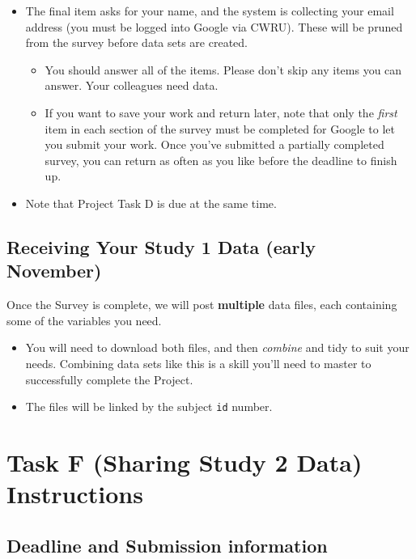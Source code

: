 \documentclass[]{book}
\providecommand{\tightlist}{%
  \setlength{\itemsep}{0pt}\setlength{\parskip}{0pt}}
\theoremstyle{definition}
\theoremstyle{definition}
\theoremstyle{definition}
\theoremstyle{remark}
\begin{document}
\begin{itemize}
\tightlist
\item
  The final item asks for your name, and the system is collecting your
  email address (you must be logged into Google via CWRU). These will be
  pruned from the survey before data sets are created.

  \begin{itemize}
  \tightlist
  \item
    You should answer all of the items. Please don't skip any items you
    can answer. Your colleagues need data.
  \item
    If you want to save your work and return later, note that only the
    \emph{first} item in each section of the survey must be completed
    for Google to let you submit your work. Once you've submitted a
    partially completed survey, you can return as often as you like
    before the deadline to finish up.
  \end{itemize}
\item
  Note that Project Task D is due at the same time.
\end{itemize}

\hypertarget{receiving-your-study-1-data-early-november}{%
\section{Receiving Your Study 1 Data (early
November)}\label{receiving-your-study-1-data-early-november}}

Once the Survey is complete, we will post \textbf{multiple} data files,
each containing some of the variables you need.

\begin{itemize}
\tightlist
\item
  You will need to download both files, and then \emph{combine} and tidy
  to suit your needs. Combining data sets like this is a skill you'll
  need to master to successfully complete the Project.
\item
  The files will be linked by the subject \texttt{id} number.
\end{itemize}

\hypertarget{taskF}{%
\chapter{Task F (Sharing Study 2 Data) Instructions}\label{taskF}}

\hypertarget{deadline-and-submission-information-5}{%
\section{Deadline and Submission
information}\label{deadline-and-submission-information-5}}
\end{document}

